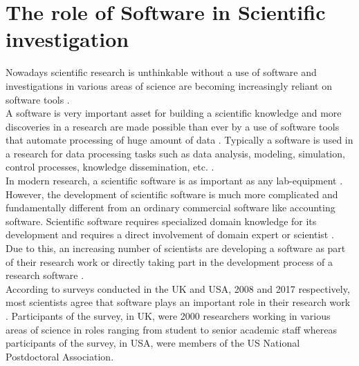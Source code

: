 \chapter{The role of Software in Scientific investigation}
\label{ch:Roles}

%

Nowadays scientific research is unthinkable without a use of software and investigations in various areas of science are becoming increasingly reliant on software tools \citep{goble2014better, storer2017bridging, hannay2009scientists, jimenez2017four}. \\

A software is very important asset for building a scientific knowledge and more discoveries in a research are made possible than ever by a use of software tools that automate processing of huge amount of data \citep{jimenez2017four}. Typically a software is used in a research for data processing tasks such as data analysis, modeling, simulation, control processes, knowledge dissemination, etc. \citep{hannay2009scientists, pan2016disciplinary}. \\

In modern research, a scientific software is as important as any lab-equipment \citep{wilson2014best}. However, the development of scientific software is much more complicated and fundamentally different from an ordinary commercial software like accounting software. Scientific software requires specialized domain knowledge for its development and requires a direct involvement of domain expert or scientist \citep{wilson2014best, segal2008developing}. Due to this, an increasing number of scientists are developing a software as part of their research work or directly taking part in the development process of a research software \citep{jimenez2017four, kanewala2014testing}. \\

According to surveys conducted in the \ac{UK} and \ac{USA}, 2008 and 2017 respectively, most scientists agree that software plays an important role in their research work \citep{hettrick2014uk, nangia2017track}. Participants of the survey, in \ac{UK}, were 2000 researchers working in various areas of science in roles ranging from student to senior academic staff whereas participants of the survey, in \ac{USA}, were members of the US National Postdoctoral Association. \\
 
